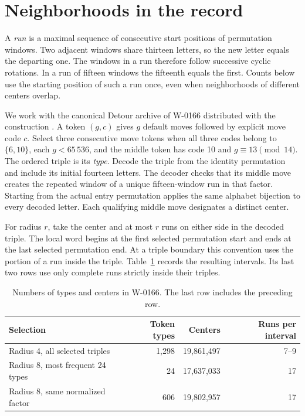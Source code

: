 \documentclass[11pt]{article}
\begin{document}
\clearpage
\section{Neighborhoods in the record}
A \emph{run} is a maximal sequence of consecutive start positions of permutation windows. Two adjacent windows share thirteen letters, so the new letter equals the departing one. The windows in a run therefore follow successive cyclic rotations. In a run of fifteen windows the fifteenth equals the first. Counts below use the starting position of such a run once, even when neighborhoods of different centers overlap.

We work with the canonical Detour archive of W-0166 distributed with the construction \cite{construction,format}. A token \((g,c)\) gives \(g\) default moves followed by explicit move code \(c\). Select three consecutive move tokens when all three codes belong to \(\{6,10\}\), each \(g<65\,536\), and the middle token has code 10 and \(g\equiv13\pmod {14}\). The ordered triple is its \emph{type}. Decode the triple from the identity permutation and include its initial fourteen letters. The decoder checks that its middle move creates the repeated window of a unique fifteen-window run in that factor. Starting from the actual entry permutation applies the same alphabet bijection to every decoded letter. Each qualifying middle move designates a distinct center.

For radius \(r\), take the center and at most \(r\) runs on either side in the decoded triple. The local word begins at the first selected permutation start and ends at the last selected permutation end. At a triple boundary this convention uses the portion of a run inside the triple. Table~\ref{tab:counts} records the resulting intervals. Its last two rows use only complete runs strictly inside their triples.

\begin{table}[h]\centering
\caption{Numbers of types and centers in W-0166. The last row includes the preceding row.}\label{tab:counts}
\smallskip\small
\begin{tabular}{@{}lrrr@{}}\toprule
Selection & Token types & Centers & Runs per interval\\\midrule
Radius 4, all selected triples & 1,298 & 19,861,497 & 7--9\\
Radius 8, most frequent 24 types & 24 & 17,637,033 & 17\\
Radius 8, same normalized factor & 606 & 19,802,957 & 17\\\bottomrule
\end{tabular}
\end{table}
\end{document}
